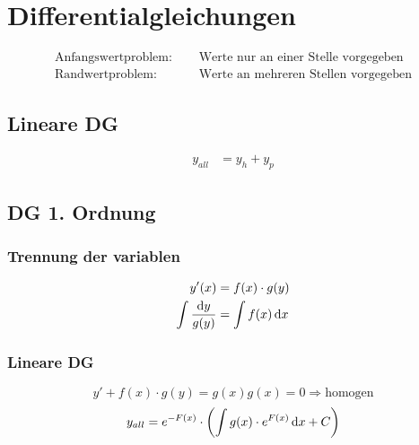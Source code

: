 \newpage
\section{Differentialgleichungen}

\begin{align*}
\text{Anfangswertproblem:}\quad&\text{ Werte nur an einer Stelle vorgegeben}\\
\text{Randwertproblem:}\quad&\text{ Werte an mehreren Stellen vorgegeben}
\end{align*}

\subsection*{Lineare DG}
\begin{align*}
y_{all}&=y_h+y_p
\end{align*}

\subsection{DG 1. Ordnung}
\begin{multicols}{2}
\subsubsection*{Trennung der variablen}
\begin{align*}
y'(x)&=f(x)\cdot g(y)\\
\int\frac{\mathop{}\!\mathrm{d} y}{g(y)}&=\int f(x)\mathop{}\!\mathrm{d} x
\end{align*}
\vfill
\subsubsection*{Lineare DG}
\[y'+f(x)\cdot g(y)=g(x) \text{$g(x)=0\Rightarrow$homogen}\]
\[y_{all}=e^{-F(x)}\cdot\left(\int g(x)\cdot e^{F(x)}\mathop{}\!\mathrm{d} x+C\right)\]
\vfill
\end{multicols}

